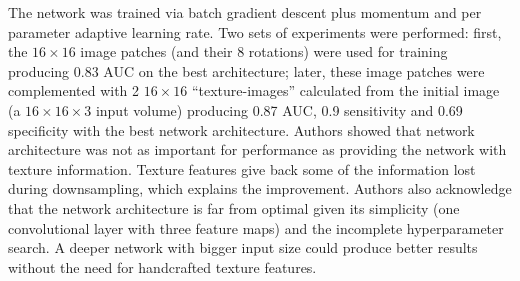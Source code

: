 The network was trained via batch gradient descent plus momentum and per parameter adaptive learning rate. Two sets of experiments were performed: first, the $16 \times 16$ image patches (and their 8 rotations) were used for training producing 0.83 AUC on the best architecture; later, these image patches were complemented with 2 $16 \times 16$ ``texture-images'' calculated from the initial image (a $16\times 16 \times 3$ input volume) producing 0.87 AUC, 0.9 sensitivity and 0.69 specificity with the best network architecture.
Authors showed that network architecture was not as important for performance as providing the network with texture information.
Texture features give back some of the information lost during downsampling, which explains the improvement. Authors also acknowledge that the network architecture is far from optimal given its simplicity (one convolutional layer with three feature maps) and the incomplete hyperparameter search. A deeper network with bigger input size could produce better results without the need for handcrafted texture features.



